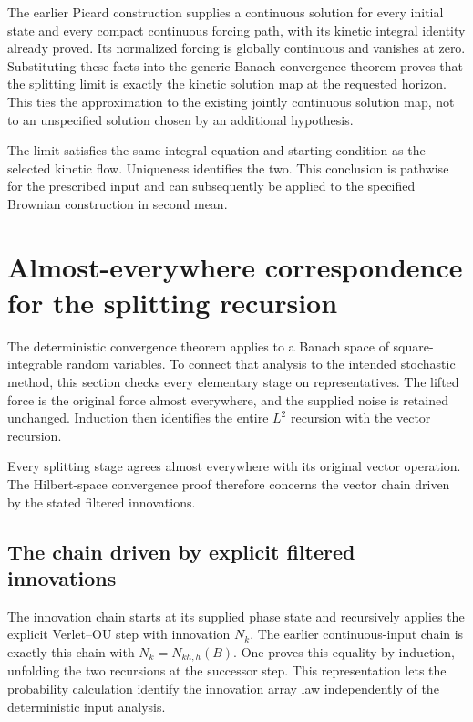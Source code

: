 \documentclass[11pt,a4paper]{report}
\begin{document}
The earlier Picard construction supplies a continuous solution for every initial state and every compact continuous forcing path, with its kinetic integral identity already proved. Its normalized forcing is globally continuous and vanishes at zero. Substituting these facts into the generic Banach convergence theorem proves that the splitting limit is exactly the kinetic solution map at the requested horizon. This ties the approximation to the existing jointly continuous solution map, not to an unspecified solution chosen by an additional hypothesis.



The limit satisfies the same integral equation and starting condition as the selected kinetic flow. Uniqueness identifies the two. This conclusion is pathwise for the prescribed input and can subsequently be applied to the specified Brownian construction in second mean.

\section{\texorpdfstring{Almost-everywhere correspondence for the splitting recursion}{Almost-everywhere correspondence for the splitting recursion}}
\label{proof-module-KineticLangevin-KineticSplittingLp-lean}


The deterministic convergence theorem applies to a Banach space of square-integrable random variables. To connect that analysis to the intended stochastic method, this section checks every elementary stage on representatives. The lifted force is the original force almost everywhere, and the supplied noise is retained unchanged. Induction then identifies the entire \(L^{2}\) recursion with the vector recursion.



Every splitting stage agrees almost everywhere with its original vector operation. The Hilbert-space convergence proof therefore concerns the vector chain driven by the stated filtered innovations.

\subsection{\texorpdfstring{The chain driven by explicit filtered innovations}{The chain driven by explicit filtered innovations}}
\label{report-step-KineticLangevin-KineticSplittingLp-lean-1}


The innovation chain starts at its supplied phase state and recursively applies the explicit Verlet–OU step with innovation \(N_k\). The earlier continuous-input chain is exactly this chain with \(N_k=N_{kh,h}(B)\). One proves this equality by induction, unfolding the two recursions at the successor step. This representation lets the probability calculation identify the innovation array law independently of the deterministic input analysis.
\end{document}
